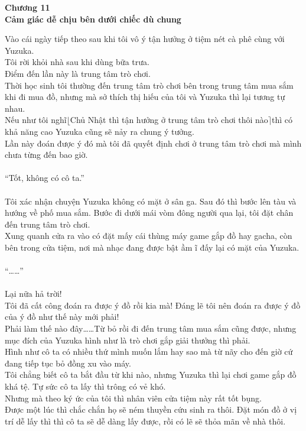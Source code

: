 \documentclass[12pt,a4paper, twosides]{book}
\begin{document}
    \begin{center}
    \textbf{\large Chương 11 \\ Cảm giác dễ chịu bên dưới chiếc dù chung}
    \end{center}
    \noindent
Vào cái ngày tiếp theo sau khi tôi vô ý tận hưởng ở tiệm nét cà phê cùng với Yuzuka.\\
Tôi rời khỏi nhà sau khi dùng bữa trưa.\\
Điểm đến lần này là trung tâm trò chơi.\\
Thời học sinh tôi thường đến trung tâm trò chơi bên trong trung tâm mua sắm khi đi mua đồ, nhưng mà sở thích thị hiếu của tôi và Yuzuka thì lại tương tự nhau.\\
Nếu như tôi nghĩ$\lfloor$Chủ Nhật thì tận hưởng ở trung tâm trò chơi thôi nào$\rceil$thì có khả năng cao Yuzuka cũng sẽ nảy ra chung ý tưởng.\\
Lần này đoán được ý đó mà tôi đã quyết định chơi ở trung tâm trò chơi mà mình chưa từng đến bao giờ.\\
\\
“Tốt, không có cô ta.”\\
\\
Tôi xác nhận chuyện Yuzuka không có mặt ở sân ga. Sau đó thì bước lên tàu và hướng về phố mua sắm. Bước đi dưới mái vòm đông người qua lại, tôi đặt chân đến trung tâm trò chơi.\\
Xung quanh cửa ra vào có đặt mấy cái thùng máy game gắp đồ hay gacha, còn bên trong cửa tiệm, nơi mà nhạc đang được bật ầm ĩ đấy lại có mặt của Yuzuka.\\
\\
“……”\\
\\
Lại nữa hả trời!\\
Tôi đã cất công đoán ra được ý đồ rồi kia mà! Đáng lẽ tôi nên đoán ra được ý đồ của ý đồ như thế này mới phải!\\
Phải làm thế nào đây……Từ bỏ rồi đi đến trung tâm mua sắm cũng được, nhưng mục đích của Yuzuka hình như là trò chơi gắp giải thưởng thì phải.\\
Hình như cô ta có nhiều thứ mình muốn lắm hay sao mà từ nãy cho đến giờ cứ đang tiếp tục bỏ đồng xu vào máy.\\
Tôi chẳng biết cô ta bắt đầu từ khi nào, nhưng Yuzuka thì lại chơi game gắp đồ khá tệ. Tự sức cô ta lấy thì trông có vẻ khó.\\
Nhưng mà theo ký ức của tôi thì nhân viên cửa tiệm này rất tốt bụng.\\
Được một lúc thì chắc chắn họ sẽ ném thuyền cứu sinh ra thôi. Đặt món đồ ở vị trí dễ lấy thì thì cô ta sẽ dễ dàng lấy được, rồi có lẽ sẽ thỏa mãn về nhà thôi.\\
\end{document}
